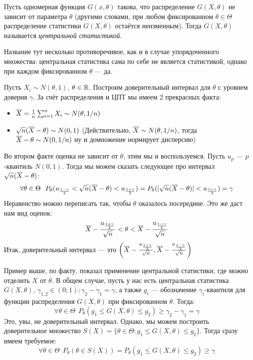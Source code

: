 \begin{definition}
	Пусть одномерная функция $G(x, \theta)$ такова, что распределение $G(X, \theta)$ не зависит от параметра $\theta$ (другими словами, при любом фиксированном $\theta \in \Theta$ распределение статистики $G(X, \theta)$ остаётся неизменным). Тогда $G(X, \theta)$ называется \textit{центральной статистикой}.
\end{definition}

\begin{anote}
	Название тут несколько противоречивое, как и в случае упорядоченного множества: центральная статистика сама по себе не является статистикой, однако при каждом фиксированном $\theta$ --- да.
\end{anote}

\begin{example}
	Пусть $X_i \sim N(\theta, 1)$, $\theta \in \mathbb{R}$. Построим доверительный интервал для $\theta$ с уровнем доверия $\gamma$. За счёт распределения и ЦПТ мы имеем 2 прекрасных факта:
	\begin{itemize}
		\item $\overline{X} = \frac{1}{n}\sum_{i = 1}^n X_i \sim N(\theta, 1 / n)$
		
		\item $\sqrt{n}(\overline{X} - \theta) \sim N(0, 1)$ (Действительно, $\overline{X} \sim N(\theta, 1 / n)$, тогда $\overline{X} - \theta \sim N(0, 1 / n)$ ну и домножение нормирует дисперсию)
	\end{itemize}
	Во втором факте оценка не зависит от $\theta$, этим мы и воспользуемся. Пусть $u_p$ --- $p$-квантиль $N(0, 1)$. Тогда мы можем сказать следующее про интервал $\sqrt{n}(\overline{X} - \theta)$:
	\[
		\forall \theta \in \Theta\ \ P_\theta(u_{\frac{1 - \gamma}{2}} < \sqrt{n}(\overline{X} - \theta) < u_{\frac{1 + \gamma}{2}}) = P_\theta(|\sqrt{n}(\overline{X} - \theta)| < u_{\frac{1 + \gamma}{2}}) = \gamma
	\]
	Неравенство можно переписать так, чтобы $\theta$ оказалось посередине. Это же даст нам вид оценок:
	\[
		 \overline{X} - \frac{u_{\frac{1 + \gamma}{2}}}{\sqrt{n}} < \theta < \overline{X} - \frac{u_{\frac{1 - \gamma}{2}}}{\sqrt{n}}
	\]
	Итак, доверительный интервал --- это $\left(\overline{X} - \frac{u_{\frac{1 + \gamma}{2}}}{\sqrt{n}}, \overline{X} - \frac{u_{\frac{1 - \gamma}{2}}}{\sqrt{n}}\right)$
\end{example}

\begin{note}
	Пример выше, по факту, показал применение центральной статистики, где можно отделить $X$ от $\theta$. В общем случае, пусть у нас есть центральная статистика $G(X, \theta)$, $\gamma_{1, 2} \in (0; 1) \colon \gamma_2 - \gamma_1 = \gamma$, а также $g_i$ --- обозначение $\gamma_i$-квантиля для функции распределения $G(X, \theta)$ при фиксированном $\theta$. Тогда:
	\[
		\forall \theta \in \Theta\ \ P_\theta(g_1 \le G(X, \theta) \le g_2) \ge \gamma_2 - \gamma_1 = \gamma
	\]
	Это, увы, не доверительный интервал. Однако, мы можем построить доверительное множество $S(X) = \{\theta \in \Theta \colon g_1 \le G(X, \theta) \le g_2\}$. Тогда сразу имеем требуемое:
	\[
		\forall \theta \in \Theta\ \ P_\theta(\theta \in S(X)) = P_\theta(g_1 \le G(X, \theta) \le g_2) \ge \gamma
	\]
\end{note}

